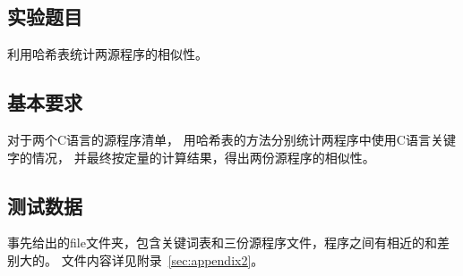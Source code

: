 \subsection{实验题目}\label{subsec:q}
{{利用哈希表统计两源程序的相似性。}}

\subsection{基本要求}\label{subsec:req}
{{对于两个C语言的源程序清单，
用哈希表的方法分别统计两程序中使用C语言关键字的情况，
并最终按定量的计算结果，得出两份源程序的相似性。}}

\subsection{测试数据}\label{subsec:test}
{{事先给出的file文件夹，包含关键词表和三份源程序文件，程序之间有相近的和差别大的。
文件内容详见附录~\ref{sec:appendix2}。}}

